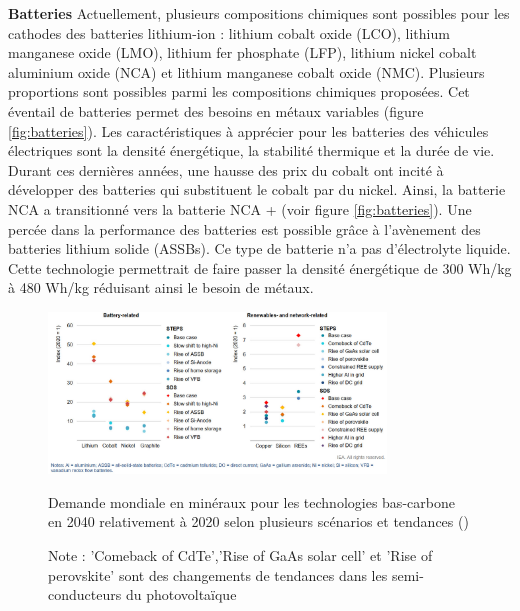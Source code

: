 \bigbreak
\textbf{Batteries}
\smallbreak
Actuellement, plusieurs compositions chimiques sont possibles pour les cathodes des batteries lithium-ion : lithium cobalt oxide (LCO), lithium manganese oxide (LMO), lithium fer phosphate (LFP), lithium nickel cobalt aluminium oxide (NCA) et lithium manganese cobalt oxide (NMC). Plusieurs proportions sont possibles parmi les compositions chimiques proposées. Cet éventail de batteries permet des besoins en métaux variables (figure \ref{fig:batteries}). Les caractéristiques à apprécier pour les batteries des véhicules électriques sont la densité énergétique, la stabilité thermique et la durée de vie. Durant ces dernières années, une hausse des prix du cobalt ont incité à développer des batteries qui substituent le cobalt par du nickel. Ainsi, la batterie NCA a transitionné vers la batterie NCA + (voir figure \ref{fig:batteries}).
\smallbreak
Une percée dans la performance des batteries est possible grâce à l'avènement des batteries lithium solide (ASSBs). Ce type de batterie n'a pas d'électrolyte liquide. Cette technologie permettrait de faire passer la densité énergétique de 300 Wh/kg à 480 Wh/kg réduisant ainsi le besoin de métaux.
\begin{figure}[!t]
    \centering
    \includegraphics[width=0.8\textwidth]{Images/supply_chain/levier_techno.jpg}
    \caption{Demande mondiale en minéraux pour les technologies bas-carbone en 2040 relativement à 2020 selon plusieurs scénarios et tendances (\cite{iea_role_2021})}
    \caption*{Note : 'Comeback of CdTe','Rise of GaAs solar cell' et 'Rise of perovskite' sont des changements de tendances dans les semi-conducteurs du photovoltaïque}
    \label{fig:techno_levier}
\end{figure}

